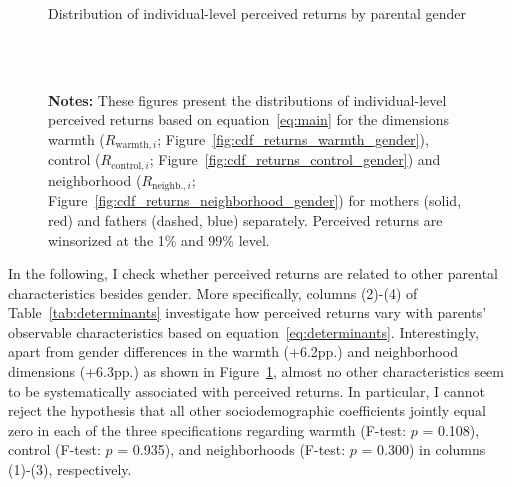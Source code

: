 \documentclass[12pt, a4paper, english]{article}
\begin{document}
\begin{figure}[h!]\centering 
  \caption{Distribution of individual-level perceived returns by parental gender}\label{fig:cdf_returns_gender}
  \vspace{-.1cm}
  \\
   \\
  \caption*{\footnotesize \textbf{Notes:} These figures present the distributions of individual-level perceived returns based on equation~\eqref{eq:main} for the dimensions warmth ($R_{\text{warmth},i}$; Figure~\ref{fig:cdf_returns_warmth_gender}), control ($R_{\text{control},i}$; Figure~\ref{fig:cdf_returns_control_gender}) and neighborhood ($R_{\text{neighb.},i}$; Figure~\ref{fig:cdf_returns_neighborhood_gender}) for mothers (solid, red) and fathers (dashed, blue) separately. Perceived returns are winsorized at the 1\% and 99\% level.}
\end{figure}

In the following, I check whether perceived returns are related to other parental characteristics besides gender. More specifically, columns (2)-(4) of Table~\ref{tab:determinants} investigate how perceived returns vary with parents' observable characteristics based on equation~\eqref{eq:determinants}. Interestingly, apart from gender differences in the warmth (+6.2pp.) and neighborhood dimensions (+6.3pp.) as shown in Figure~\ref{fig:cdf_returns_gender}, almost no other characteristics seem to be systematically associated with perceived returns. In particular, I cannot reject the hypothesis that all other sociodemographic coefficients jointly equal zero in each of the three specifications regarding warmth (F-test: $p$ = 0.108), control (F-test: $p$ = 0.935), and neighborhoods (F-test: $p$ = 0.300) in columns (1)-(3), respectively.
\end{document}
